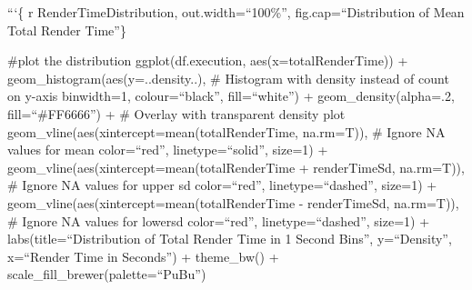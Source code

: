 \documentclass[
  twocolumn]{article}
\begin{document}
```\{ r RenderTimeDistribution, out.width=``100\%'',
fig.cap=``Distribution of Mean Total Render Time''\}

\#plot the distribution ggplot(df.execution, aes(x=totalRenderTime)) +
geom\_histogram(aes(y=..density..), \# Histogram with density instead of
count on y-axis binwidth=1, colour=``black'', fill=``white'') +
geom\_density(alpha=.2, fill=``\#FF6666'') + \# Overlay with transparent
density plot geom\_vline(aes(xintercept=mean(totalRenderTime, na.rm=T)),
\# Ignore NA values for mean color=``red'', linetype=``solid'', size=1)
+ geom\_vline(aes(xintercept=mean(totalRenderTime + renderTimeSd,
na.rm=T)), \# Ignore NA values for upper sd color=``red'',
linetype=``dashed'', size=1) +
geom\_vline(aes(xintercept=mean(totalRenderTime - renderTimeSd,
na.rm=T)), \# Ignore NA values for lowersd color=``red'',
linetype=``dashed'', size=1) + labs(title=``Distribution of Total Render
Time in 1 Second Bins'', y=``Density'', x=``Render Time in Seconds'') +
theme\_bw() + scale\_fill\_brewer(palette=``PuBu'')
\end{document}
